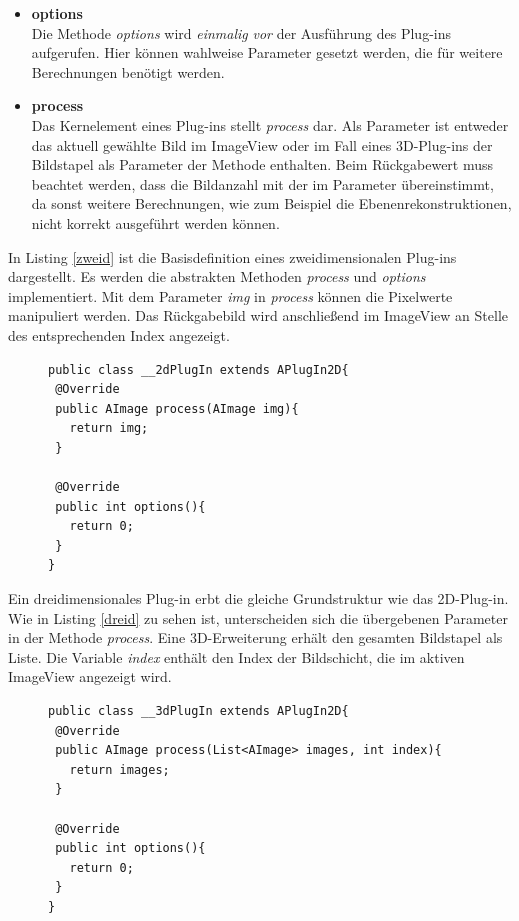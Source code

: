 \begin{itemize}
\item \textbf{options}\\
Die Methode \textit{options} wird \textit{einmalig} \textit{vor} der Ausführung des Plug-ins aufgerufen. Hier können wahlweise Parameter gesetzt werden, die für weitere Berechnungen benötigt werden.
\item \textbf{process}\\
Das Kernelement eines Plug-ins stellt \textit{process} dar. Als Parameter ist entweder das aktuell gewählte Bild im ImageView oder im Fall eines 3D-Plug-ins der Bildstapel als Parameter der Methode enthalten. Beim Rückgabewert muss beachtet werden, dass die Bildanzahl mit der im Parameter übereinstimmt, da sonst weitere Berechnungen, wie zum Beispiel die Ebenenrekonstruktionen, nicht korrekt ausgeführt werden können.

\end{itemize}

In Listing \ref{zweid} ist die Basisdefinition eines zweidimensionalen Plug-ins dargestellt. Es werden die abstrakten Methoden \textit{process} und \textit{options} implementiert. Mit dem Parameter \textit{img} in \textit{process} können die Pixelwerte manipuliert werden. Das Rückgabebild wird anschließend im ImageView an Stelle des entsprechenden Index angezeigt.

\begin{figure}[htbp]
\begin{lstlisting}[frame=leftline]
public class __2dPlugIn extends APlugIn2D{
 @Override
 public AImage process(AImage img){
   return img;
 }
 
 @Override
 public int options(){
   return 0;
 }
}
\end{lstlisting}
\end{figure}

Ein dreidimensionales Plug-in erbt die gleiche Grundstruktur wie das 2D-Plug-in. Wie in Listing \ref{dreid} zu sehen ist, unterscheiden sich die übergebenen Parameter in der Methode \textit{process}. Eine 3D-Erweiterung erhält den gesamten Bildstapel als Liste. Die Variable \textit{index} enthält den Index der Bildschicht, die im  aktiven ImageView angezeigt wird.

\begin{figure}[htbp]
\begin{lstlisting}[frame=leftline]
public class __3dPlugIn extends APlugIn2D{
 @Override
 public AImage process(List<AImage> images, int index){
   return images;
 }
 
 @Override
 public int options(){
   return 0;
 }
}
\end{lstlisting}
\end{figure}



